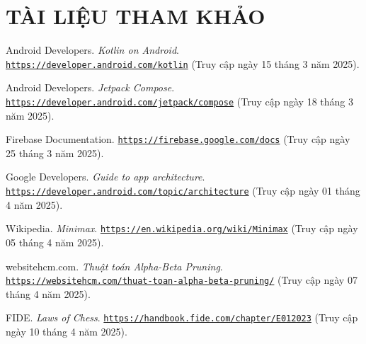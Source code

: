 \documentclass[a4paper,12pt]{article}
\begin{document}
\newpage %

\section*{\centering \textbf{TÀI LIỆU THAM KHẢO}} %


\begin{thebibliography}{99} %

    Android Developers. \textit{Kotlin on Android}.
    \href{https://developer.android.com/kotlin}{\nolinkurl{https://developer.android.com/kotlin}}
    (Truy cập ngày 15 tháng 3 năm 2025).

    Android Developers. \textit{Jetpack Compose}.
    \href{https://developer.android.com/jetpack/compose}{\nolinkurl{https://developer.android.com/jetpack/compose}}
    (Truy cập ngày 18 tháng 3 năm 2025).

    Firebase Documentation.
    \href{https://firebase.google.com/docs}{\nolinkurl{https://firebase.google.com/docs}}
    (Truy cập ngày 25 tháng 3 năm 2025).

    Google Developers. \textit{Guide to app architecture}.
    \href{https://developer.android.com/topic/architecture}{\nolinkurl{https://developer.android.com/topic/architecture}}
    (Truy cập ngày 01 tháng 4 năm 2025).

    Wikipedia. \textit{Minimax}.
    \href{https://en.wikipedia.org/wiki/Minimax}{\nolinkurl{https://en.wikipedia.org/wiki/Minimax}}
    (Truy cập ngày 05 tháng 4 năm 2025).

    websitehcm.com. \textit{Thuật toán Alpha-Beta Pruning}.
    \href{https://websitehcm.com/thuat-toan-alpha-beta-pruning/}{\nolinkurl{https://websitehcm.com/thuat-toan-alpha-beta-pruning/}}
    (Truy cập ngày 07 tháng 4 năm 2025).

    FIDE. \textit{Laws of Chess}.
    \href{https://handbook.fide.com/chapter/E012023}{\nolinkurl{https://handbook.fide.com/chapter/E012023}}
    (Truy cập ngày 10 tháng 4 năm 2025).


\end{thebibliography}
\end{document}
